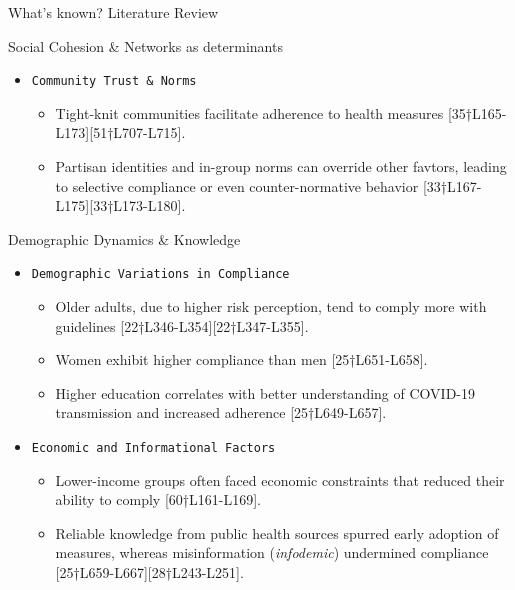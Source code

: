 \documentclass[
  ignorenonframetext,
]{beamer}
\providecommand{\tightlist}{%
  \setlength{\itemsep}{0pt}\setlength{\parskip}{0pt}}\usepackage{longtable,booktabs,array}
\begin{document}
\begin{frame}[fragile]{What's known? Literature Review}
\begin{block}{Social Cohesion \& Networks as determinants}
\begin{itemize}
  \begin{itemize}
  \tightlist
  \item
    Individuals are more likely to adopt precautions (mask-wearing,
    distancing) when their immediate social networks and local
    influencers model these behaviors
    {[}20†L278-L286{]}{[}41†L649-L657{]}.
  \item
    Group identity reinforces compliance when health behaviors are seen
    as a mark of belonging
    {[}42†L157-L165{]}{[}45†L554-L562{]}{[}45†L574-L583{]}.
  \end{itemize}
\item
  \texttt{Community\ Trust\ \&\ Norms}

  \begin{itemize}
  \tightlist
  \item
    Tight-knit communities facilitate adherence to health measures
    {[}35†L165-L173{]}{[}51†L707-L715{]}.
  \item
    Partisan identities and in-group norms can override other favtors,
    leading to selective compliance or even counter-normative behavior
    {[}33†L167-L175{]}{[}33†L173-L180{]}.
  \end{itemize}
\end{itemize}
\end{block}

\begin{block}{Demographic Dynamics \& Knowledge}
\label{demographic-dynamics-knowledge}
\begin{itemize}
\tightlist
\item
  \texttt{Demographic\ Variations\ in\ Compliance}

  \begin{itemize}
  \tightlist
  \item
    Older adults, due to higher risk perception, tend to comply more
    with guidelines {[}22†L346-L354{]}{[}22†L347-L355{]}.
  \item
    Women exhibit higher compliance than men {[}25†L651-L658{]}.
  \item
    Higher education correlates with better understanding of COVID-19
    transmission and increased adherence {[}25†L649-L657{]}.
  \end{itemize}
\item
  \texttt{Economic\ and\ Informational\ Factors}

  \begin{itemize}
  \tightlist
  \item
    Lower-income groups often faced economic constraints that reduced
    their ability to comply {[}60†L161-L169{]}.
  \item
    Reliable knowledge from public health sources spurred early adoption
    of measures, whereas misinformation (\emph{infodemic}) undermined
    compliance {[}25†L659-L667{]}{[}28†L243-L251{]}.
  \end{itemize}
\end{itemize}
\end{block}


\end{frame}
\end{document}
